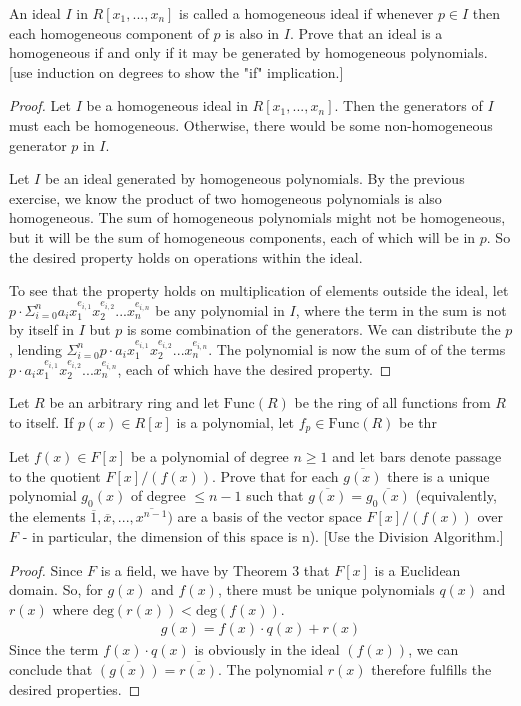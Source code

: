 \documentclass[10pt]{article}
\newenvironment{problem}[2][Problem]{\begin{trivlist}
		\item[\hskip \labelsep {\bfseries #1}\hskip \labelsep {\bfseries #2.}]}{\end{trivlist}}
\begin{document}
	\begin{problem}{1.17}
		An ideal $I$ in $R[x_1, ..., x_n]$ is called a homogeneous ideal if whenever $p \in I$ then each homogeneous component of $p$ is also in $I$. Prove that an ideal is a homogeneous if and only if it may be generated by homogeneous polynomials. [use induction on degrees to show the "if" implication.]
		\begin{proof}
			Let $I$ be a homogeneous ideal in $R[x_1, ..., x_n]$. Then the generators of $I$ must each be homogeneous. Otherwise, there would be some non-homogeneous generator $p$ in $I$.
			
			Let $I$ be an ideal generated by homogeneous polynomials. By the previous exercise, we know the product of two homogeneous polynomials is also homogeneous. The sum of homogeneous polynomials might not be homogeneous, but it will be the sum of homogeneous components, each of which will be in $p$. So the desired property holds on operations within the ideal. 
			
			To see that the property holds on multiplication of elements outside the ideal, let $p \cdot \Sigma^n_{i=0} a_i x_1^{e_{i,1}} x_2^{e_{i,2}} ... x_n^{e_{i,n}}$ be any polynomial in $I$, where the term in the sum is not by itself in $I$ but $p$ is some combination of the generators. We can distribute the $p$, lending $\Sigma^n_{i=0} p \cdot a_i x_1^{e_{i,1}} x_2^{e_{i,2}} ... x_n^{e_{i,n}}$. The polynomial is now the sum of of the terms $p \cdot a_i x_1^{e_{i,1}} x_2^{e_{i,2}} ... x_n^{e_{i,n}}$, each of which have the desired property.
		\end{proof}
	\end{problem}
	
	\begin{problem}{1.18}
	 Let $R$ be an arbitrary ring and let $\text{Func}(R)$ be the ring of all functions from $R$ to itself. If $p(x) \in R[x]$ is a polynomial, let $f_p \in \text{Func}(R)$ be thr 
	\end{problem}
		
	\begin{problem}{2.1}
		Let $f(x) \in F[x]$ be a polynomial of degree $n \geq 1$ and let bars denote passage to the quotient $F[x]/(f(x))$. Prove that for each $\overline{g(x)}$ there is a unique polynomial $g_0(x)$ of degree $\leq n-1$ such that $\overline{g(x)} = \overline{g_0(x)}$ (equivalently, the elements $\overline{1}, \overline{x}, ..., \overline{x^{n-1}})$ are a basis of the vector space $F[x]/(f(x))$ over $F$ - in particular, the dimension of this space is n). [Use the Division Algorithm.]
		\begin{proof}
			Since $F$ is a field, we have by Theorem 3 that $F[x]$ is a Euclidean domain. So, for $g(x)$ and $f(x)$, there must be unique polynomials $q(x)$ and $r(x)$ where $\text{deg}(r(x)) < \text{deg}(f(x))$.
			\begin{align*}
				g(x) = f(x) \cdot q(x) + r(x)
			\end{align*}
			Since the term $f(x) \cdot q(x)$ is obviously in the ideal $(f(x))$, we can conclude that $\overline{(g(x))} = \overline{r(x)}$.  The polynomial $r(x)$ therefore fulfills the desired properties.
		\end{proof}		
	\end{problem}
	
\end{document}
